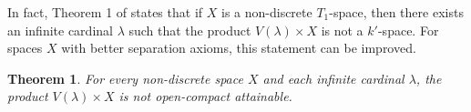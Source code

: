 \documentclass[preprint,11pt]{elsarticle}
\newtheorem{theorem}{Theorem}[section]
\newtheorem{problem}[theorem]{Problem}
\numberwithin{equation}{section}
\numberwithin{theorem}{section}
\newcommand{\w}{\omega}
\newcommand{\IR}{\mathbb{R}}
\begin{document}




In fact,  Theorem 1 of \cite{Bagley-Weddington-69} states that if $X$ is a non-discrete $T_1$-space, then  there exists  an infinite cardinal $\lambda$ such that the product $V(\lambda)\times X$ is not a $k'$-space. For spaces $X$ with better separation axioms, this statement can be improved.



\begin{theorem} \label{t:Veer-non-discrete}
For every non-discrete space $X$ and each infinite cardinal $\lambda$, the product $V(\lambda)\times X$ is not open-compact attainable.
\end{theorem}
\end{document}
